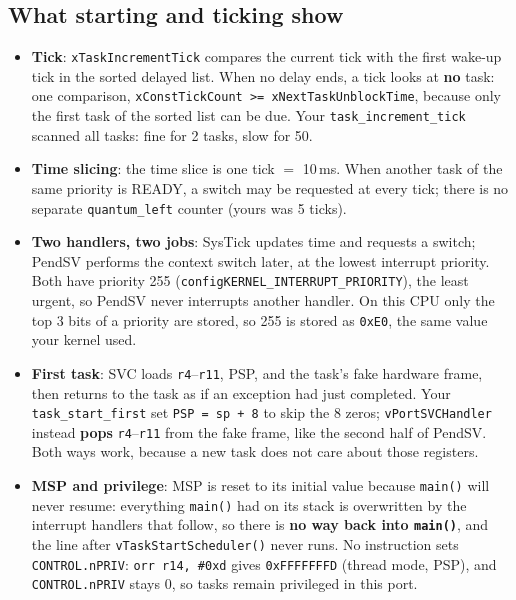 \subsection{What starting and ticking show}
\begin{itemize}
    \item \textbf{Tick}: \texttt{xTaskIncrementTick} compares the current tick with the first wake-up tick in the sorted delayed list. When no delay ends, a tick looks at \textbf{no} task: one comparison, \texttt{xConstTickCount >= xNextTaskUnblockTime}, because only the first task of the sorted list can be due. Your \texttt{task\_increment\_tick} scanned all tasks: fine for 2 tasks, slow for 50.
    \item \textbf{Time slicing}: the time slice is one tick $=$ 10\,ms. When another task of the same priority is READY, a switch may be requested at every tick; there is no separate \texttt{quantum\_left} counter (yours was 5 ticks).
    \item \textbf{Two handlers, two jobs}: SysTick updates time and requests a switch; PendSV performs the context switch later, at the lowest interrupt priority. Both have priority 255 (\texttt{configKERNEL\_INTERRUPT\_PRIORITY}), the least urgent, so PendSV never interrupts another handler. On this CPU only the top 3 bits of a priority are stored, so 255 is stored as \texttt{0xE0}, the same value your kernel used.
    \item \textbf{First task}: SVC loads \texttt{r4}--\texttt{r11}, PSP, and the task's fake hardware frame, then returns to the task as if an exception had just completed. Your \texttt{task\_start\_first} set \texttt{PSP = sp + 8} to skip the 8 zeros; \texttt{vPortSVCHandler} instead \textbf{pops} \texttt{r4}--\texttt{r11} from the fake frame, like the second half of PendSV. Both ways work, because a new task does not care about those registers.
    \item \textbf{MSP and privilege}: MSP is reset to its initial value because \texttt{main()} will never resume: everything \texttt{main()} had on its stack is overwritten by the interrupt handlers that follow, so there is \textbf{no way back into \texttt{main()}}, and the line after \texttt{vTaskStartScheduler()} never runs. No instruction sets \texttt{CONTROL.nPRIV}: \texttt{orr r14, \#0xd} gives \texttt{0xFFFFFFFD} (thread mode, PSP), and \texttt{CONTROL.nPRIV} stays 0, so tasks remain privileged in this port.
\end{itemize}

